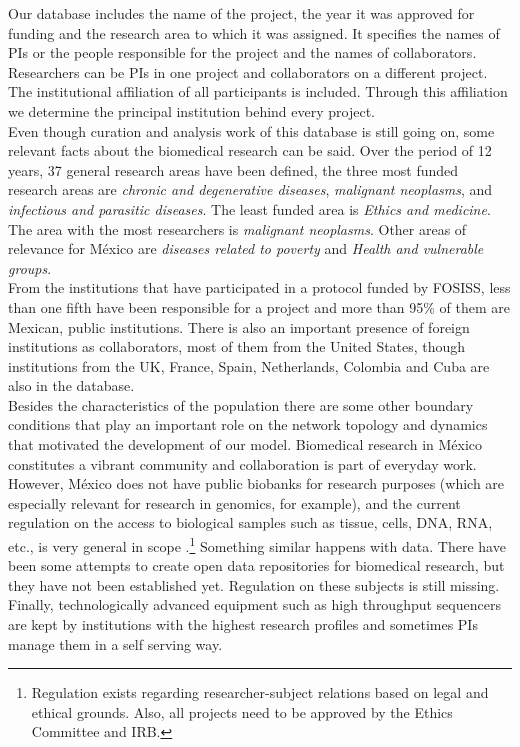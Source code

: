\documentclass{bmcart}
\begin{document}
Our database includes the name of the project, the year it was
approved for funding and the research area to which it was
assigned. It specifies the names of PIs or the people responsible for
the project and the names of collaborators.  Researchers can be PIs in
one project and collaborators on a different project. The
institutional affiliation of all participants is included. Through
this affiliation we determine the principal institution behind every
project.\\

Even though curation and analysis work of this database is still going
on, some relevant facts about the biomedical research can be
said. Over the period of 12 years, 37 general research areas have been
defined, the three most funded research areas are \emph{chronic and
  degenerative diseases}, \emph{malignant neoplasms}, and
\emph{infectious and parasitic diseases}. The least funded area is
\emph{Ethics and medicine}. The area with the most researchers is
\emph{malignant neoplasms}. Other areas of relevance for M\'exico are
\emph{diseases related to poverty} and \emph{Health and vulnerable
  groups}. \\

From the institutions that have participated in a protocol funded by FOSISS,
less than one fifth have been responsible for a project and more than 95\% of
them are Mexican, public institutions. There is also an important presence of
foreign institutions as collaborators, most of them from the United States,
though institutions from the UK, France, Spain, Netherlands, Colombia and Cuba
are also in the database.\\ 

Besides the characteristics of the population there are some other boundary
conditions that play an important role on the network topology and dynamics that
motivated the development of our model. Biomedical research in M\'exico
constitutes a vibrant community and collaboration is part of everyday
work. However, M\'exico does not have public biobanks for research purposes
(which are especially relevant for research in genomics, for example), and the
current regulation on the access to biological samples such as tissue,
cells, DNA, RNA, etc., is very general in scope 
{\color{red}\cite{Motta-Saruwatari:2016}}.\footnote{Regulation exists regarding
  researcher-subject relations based on legal and ethical grounds. Also, all
  projects need to be approved by the Ethics Committee and IRB.} Something
similar happens with data. There have been some attempts to create open data
repositories for biomedical research, but they have not been established
yet. Regulation on these subjects is still missing. Finally, technologically
advanced equipment such as high throughput sequencers are kept by institutions
with the highest research profiles and sometimes PIs manage them in a self serving way.\\
\end{document}
